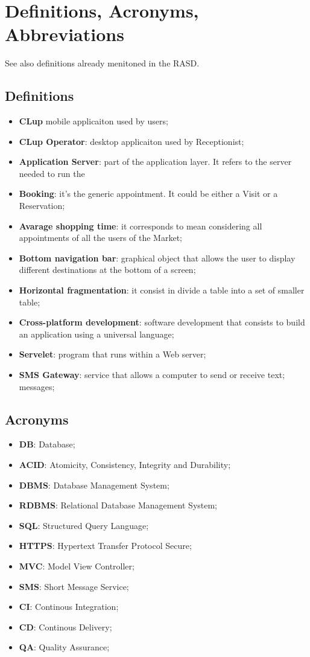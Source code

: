 \section{Definitions, Acronyms, Abbreviations}
See also definitions already menitoned in the RASD.
\subsection{Definitions}
\begin{itemize}
\item \textbf{CLup} mobile applicaiton used by users;
\item \textbf{CLup Operator}: desktop applicaiton used by Receptionist;
\item \textbf{Application Server}: part of the application layer. It refers to the server needed to run the 
\item \textbf{Booking}: it's the generic appointment. It could be either a Visit or a Reservation;
\item \textbf{Avarage shopping time}: it corresponds to mean considering all appointments of all the users of the Market; 
\item \textbf{Bottom navigation bar}: graphical object that allows the user to display different destinations at the bottom of a screen;
\item \textbf{Horizontal fragmentation}: it consist in divide a table into a set of smaller table;
\item \textbf{Cross-platform development}: software development that consists to build an application using a universal language;
\item \textbf{Servelet}: program that runs within a Web server;
\item \textbf{SMS Gateway}: service that allows a computer to send or receive text; messages; 
\end{itemize}
\subsection{Acronyms}
\begin{itemize}
\item \textbf{DB}: Database;
\item \textbf{ACID}: Atomicity, Consistency, Integrity and Durability;
\item \textbf{DBMS}: Database Management System;
\item \textbf{RDBMS}: Relational Database Management System;
\item \textbf{SQL}: Structured Query Language;
\item \textbf{HTTPS}: Hypertext Transfer Protocol Secure;
\item \textbf{MVC}: Model View Controller;
\item \textbf{SMS}: Short Message Service;
\item \textbf{CI}: Continous Integration;
\item \textbf{CD}: Continous Delivery;
\item \textbf{QA}: Quality Assurance;
\end{itemize}


